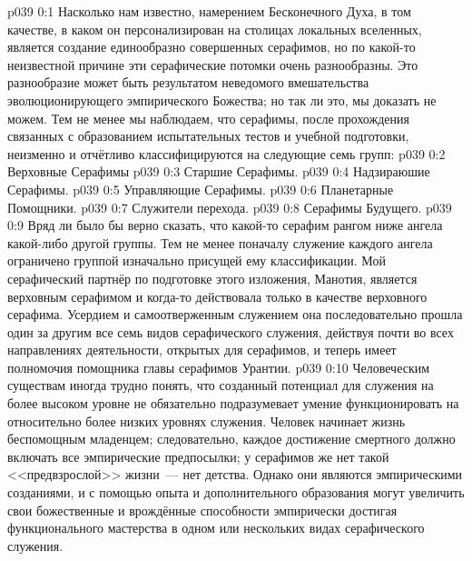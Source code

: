 \author{Мелхиседек}
\vs p039 0:1 Насколько нам известно, намерением Бесконечного Духа, в том качестве, в каком он персонализирован на столицах локальных вселенных, является создание единообразно совершенных серафимов, но по какой\hyp{}то неизвестной причине эти серафические потомки очень разнообразны. Это разнообразие может быть результатом неведомого вмешательства эволюционирующего эмпирического Божества; но так ли это, мы доказать не можем. Тем не менее мы наблюдаем, что серафимы, после прохождения связанных с образованием испытательных тестов и учебной подготовки, неизменно и отчётливо классифицируются на следующие семь групп:
\vs p039 0:2 Верховные Серафимы
\vs p039 0:3 Старшие Серафимы.
\vs p039 0:4 Надзираюшие Серафимы.
\vs p039 0:5 Управляющие Серафимы.
\vs p039 0:6 Планетарные Помощники.
\vs p039 0:7 Служители перехода.
\vs p039 0:8 Серафимы Будущего.
\vs p039 0:9 \pc Вряд ли было бы верно сказать, что какой\hyp{}то серафим рангом ниже ангела какой\hyp{}либо другой группы. Тем не менее поначалу служение каждого ангела ограничено группой изначально присущей ему классификации. Мой серафический партнёр по подготовке этого изложения, Манотия, является верховным серафимом и когда\hyp{}то действовала только в качестве верховного серафима. Усердием и самоотверженным служением она последовательно прошла один за другим все семь видов серафического служения, действуя почти во всех направлениях деятельности, открытых для серафимов, и теперь имеет полномочия помощника главы серафимов Урантии.
\vs p039 0:10 Человеческим существам иногда трудно понять, что созданный потенциал для служения на более высоком уровне не обязательно подразумевает умение функционировать на относительно более низких уровнях служения. Человек начинает жизнь беспомощным младенцем; следовательно, каждое достижение смертного должно включать все эмпирические предпосылки; у серафимов же нет такой <<предвзрослой>> жизни~--- нет детства. Однако они являются эмпирическими созданиями, и с помощью опыта и дополнительного образования могут увеличить свои божественные и врождённые способности эмпирически достигая функционального мастерства в одном или нескольких видах серафического служения.
